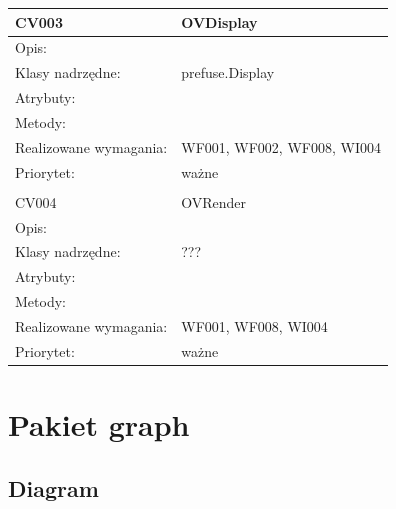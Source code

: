 \documentclass[a4paper,10pt]{article}
\begin{document}
\begin{center}
\begin{longtable}{|m{3cm}|m{9cm}|}
CV003 & OVDisplay \\ \hline
Opis: &     \\ \hline
Klasy nadrzędne: &  prefuse.Display   \\ \hline
Atrybuty: & %
 \\ \hline
Metody: & %
  \\ \hline
Realizowane wymagania: & WF001, WF002, WF008, WI004 \\ \hline
Priorytet: & ważne  \\ \hline

\multicolumn{2}{c}{} \\
 \hline

CV004 & OVRender \\ \hline
Opis: &     \\ \hline
Klasy nadrzędne: &  ???   \\ \hline
Atrybuty: & %
 \\ \hline
Metody: & %
  \\ \hline
Realizowane wymagania: & WF001, WF008, WI004 \\ \hline
Priorytet: & ważne  \\ \hline



\end{longtable}

\end{center}

\section{Pakiet graph}

\subsection{Diagram}
\end{document}
